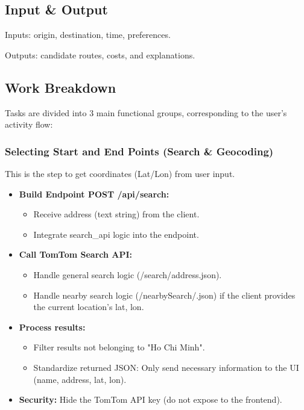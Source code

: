 \subsection{Input \& Output}
Inputs: origin, destination, time, preferences. 

Outputs: candidate routes, costs, and explanations.

\subsection{Work Breakdown}      
Tasks are divided into 3 main functional groups, corresponding to the user's activity flow:
\subsubsection{Selecting Start and End Points (Search \& Geocoding)}
This is the step to get coordinates (Lat/Lon) from user input.
\begin{itemize}
    \item \textbf{Build Endpoint POST /api/search:}
    \begin{itemize}
        \item Receive address (text string) from the client.
        \item Integrate search\_api logic into the endpoint.
    \end{itemize}
    \item \textbf{Call TomTom Search API:}
    \begin{itemize}
        \item Handle general search logic (/search/{address}.json).
        \item Handle nearby search logic (/nearbySearch/.json) if the client provides the current location's lat, lon.
    \end{itemize}
    \item \textbf{Process results:}
    \begin{itemize}
        \item Filter results not belonging to "Ho Chi Minh".
        \item Standardize returned JSON: Only send necessary information to the UI (name, address, lat, lon).
    \end{itemize}
    \item \textbf{Security:} Hide the TomTom API key (do not expose to the frontend).
\end{itemize}

